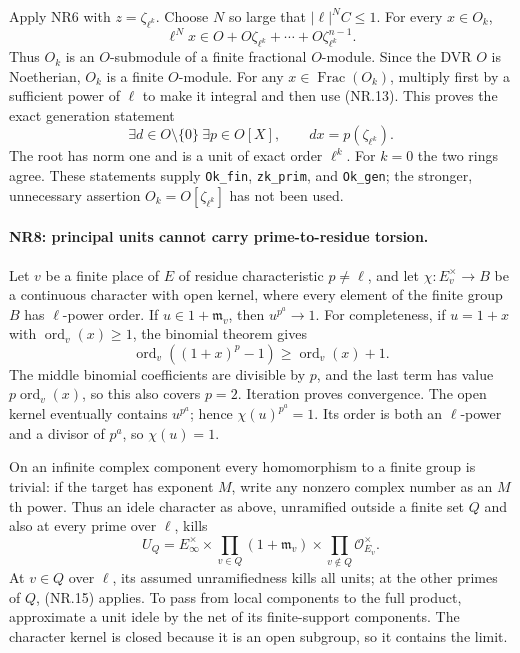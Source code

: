 Apply NR6 with $z=\zeta_{\ell^k}$. Choose $N$ so large that
$|\ell|^N C\le1$. For every $x\in O_k$,
\[
              \ell^N x\in
                O+O\zeta_{\ell^k}+\cdots+O\zeta_{\ell^k}^{n-1}.
                                                               \tag{NR.13}
\]
Thus $O_k$ is an $O$-submodule of a finite fractional $O$-module.
Since the DVR $O$ is Noetherian, $O_k$ is a finite $O$-module.
For any $x\in\operatorname{Frac}(O_k)$, multiply first by a
sufficient power of $\ell$ to make it integral and then use
(NR.13). This proves the exact generation statement
\[
 \exists d\in O\setminus\{0\}\ \exists p\in O[X],
                         \qquad dx=p(\zeta_{\ell^k}).  \tag{NR.14}
\]
The root has norm one and is a unit of exact order $\ell^k$.
For $k=0$ the two rings agree. These statements supply
\texttt{Ok\_fin}, \texttt{zk\_prim}, and \texttt{Ok\_gen}; the
stronger, unnecessary assertion $O_k=O[\zeta_{\ell^k}]$ has not
been used.

\paragraph{NR8: principal units cannot carry prime-to-residue torsion.}
Let $v$ be a finite place of $E$ of residue characteristic $p\ne\ell$,
and let $\chi:E_v^\times\to B$ be a continuous character with open
kernel, where every element of the finite group $B$ has
$\ell$-power order. If $u\in1+\mathfrak m_v$, then
$u^{p^a}\to1$. For completeness, if $u=1+x$ with
$\operatorname{ord}_v(x)\ge1$, the binomial theorem gives
\[
 \operatorname{ord}_v((1+x)^p-1)
          \ge \operatorname{ord}_v(x)+1.              \tag{NR.15}
\]
The middle binomial coefficients are divisible by $p$, and the
last term has value $p\operatorname{ord}_v(x)$, so this also covers
$p=2$. Iteration proves convergence. The open kernel eventually
contains $u^{p^a}$; hence $\chi(u)^{p^a}=1$. Its order is both an
$\ell$-power and a divisor of $p^a$, so $\chi(u)=1$.

On an infinite complex component every homomorphism to a finite
group is trivial: if the target has exponent $M$, write any
nonzero complex number as an $M$th power. Thus an idele character
as above, unramified outside a finite set $Q$ and also at every
prime over $\ell$, kills
\[
 U_Q=E_\infty^\times\times
       \prod_{v\in Q}(1+\mathfrak m_v)
                      \times\prod_{v\notin Q}\mathcal O_{E_v}^\times.
                                                               \tag{NR.16}
\]
At $v\in Q$ over $\ell$, its assumed unramifiedness kills all units;
at the other primes of $Q$, (NR.15) applies. To pass from local
components to the full product, approximate a unit idele by the
net of its finite-support components. The character kernel is
closed because it is an open subgroup, so it contains the limit.

